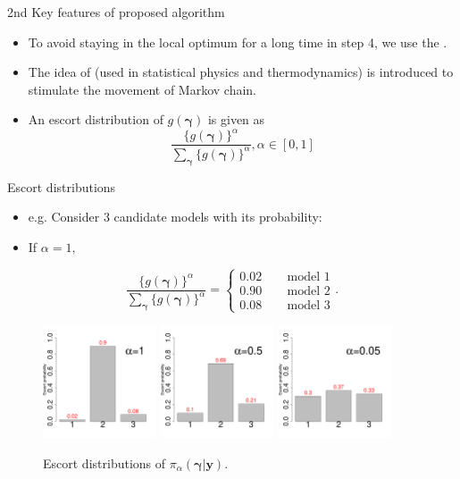 \documentclass[citecolor=blue,10pt]{beamer}
\def\bg{{\boldsymbol \gamma}}
\newcommand{\0} {\mbox{\boldmath$0$}}
\newcommand{\uy}{{\boldsymbol y}}
\begin{document}
\begin{frame}{2nd Key features of proposed algorithm}
\begin{itemize}\itemsep=5mm
\item To avoid staying in the local optimum for a long time in step 4, we use the {\color{red}{escort distribution}}.
\item The idea of {\color{red}{escort distribution}} (used in statistical physics and thermodynamics) is introduced to stimulate the movement of Markov chain.
\item An escort distribution of $g(\bg)$ is given as 
$$  \frac{\{g(\bg)\}^\alpha}{\sum_{\bg}\{g(\bg)\}^\alpha}, \alpha\in[0,1]$$
\end{itemize}
\end{frame}
\begin{frame}{Escort distributions}
\begin{itemize}

\item e.g. Consider 3 candidate models with its probability: 
\item If $\alpha=1,$
\end{itemize}
$$\frac{\{g(\bg)\}^\alpha}{\sum_{\bg}\{g(\bg)\}^\alpha}=\begin{cases} 0.02\quad & \text{model 1} \\ 0.90~\quad &\text{model 2} \\0.08~\quad &\text{model 3} \end{cases}.$$
\begin{figure}
\includegraphics[trim=5mm 5mm 0 5mm,width=0.3\textwidth]{escort_fig1.pdf}
\includegraphics[trim=5mm 5mm 0 5mm,width=0.3\textwidth]{escort_fig2.pdf}
\includegraphics[trim=5mm 5mm 0 5mm,width=0.3\textwidth]{escort_fig3.pdf}
\caption{Escort distributions of $\pi_\alpha (\bg |\uy)$.}
\end{figure}
\end{frame}
\end{document}
